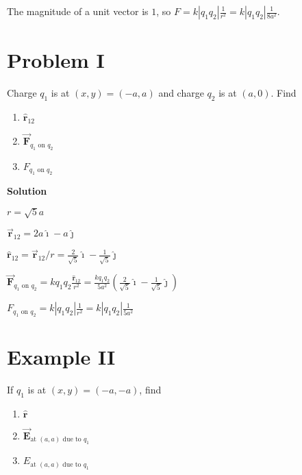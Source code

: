 \documentclass{article}
\newcommand{\ds}[0]{\displaystyle}
\newcommand{\ihat}[0]{\hat{\boldsymbol{\imath}}}
\newcommand{\jhat}[0]{\hat{\boldsymbol{\jmath}}}
\newcommand{\rhat}[0]{\hat{\mathbf{r}}}
\newcommand{\bfvec}[1]{\vec{\mathbf{#1}}}
\begin{document}
The magnitude of a unit vector is $1$, so
$\ds F=k|q_1q_2|\frac{1}{r^2}=k|q_1q_2|\frac{1}{8a^2}$.

\newpage

\section{Problem I}

Charge $q_1$ is at $(x,y)=(-a,a)$ and charge $q_2$ is at $(a, 0)$. Find

\begin{enumerate}

  \item $\rhat_{12}$

  \item $\bfvec{F}_{q_1\text{ on }q_2}$

  \item $F_{q_1\text{ on }q_2}$

\end{enumerate}

\ifsolutions
\textbf{Solution}

$r = \sqrt{5}a$

$\bfvec{r}_{12}=2a\ihat-a\jhat$

$\rhat_{12}=\bfvec{r}_{12}/r=\frac{2}{\sqrt{5}}\ihat-\frac{1}{\sqrt{5}}\jhat$

$\ds\bfvec{F}_{q_1\text{ on }q_2}=kq_1q_2\frac{\rhat_{12}}{r^2}=\frac{kq_1q_2}{5a^2}\left(\frac{2}{\sqrt{5}}\ihat-\frac{1}{\sqrt{5}}\jhat\right)$

$\ds F_{q_1\text{ on }q_2} = k|q_1q_2|\frac{1}{r^2}= k|q_1q_2|\frac{1}{5a^2}$
\else


\fi

\newpage

\section{Example II}

If $q_1$ is at $(x,y)=(-a,-a)$, find

\begin{enumerate}

  \item $\rhat$

  \item $\bfvec{E}_{\text{at }(a,a)\text{ due to }q_1}$

  \item $E_{\text{at }(a,a)\text{ due to }q_1}$

\end{enumerate}
\end{document}
